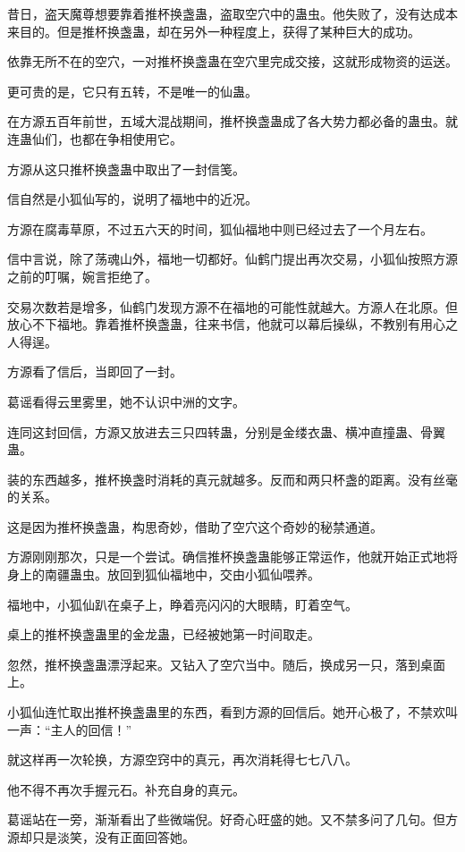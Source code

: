 \begin{this_body}
昔日，盗天魔尊想要靠着推杯换盏蛊，盗取空穴中的蛊虫。他失败了，没有达成本来目的。但是推杯换盏蛊，却在另外一种程度上，获得了某种巨大的成功。

依靠无所不在的空穴，一对推杯换盏蛊在空穴里完成交接，这就形成物资的运送。

更可贵的是，它只有五转，不是唯一的仙蛊。

在方源五百年前世，五域大混战期间，推杯换盏蛊成了各大势力都必备的蛊虫。就连蛊仙们，也都在争相使用它。

方源从这只推杯换盏蛊中取出了一封信笺。

信自然是小狐仙写的，说明了福地中的近况。

方源在腐毒草原，不过五六天的时间，狐仙福地中则已经过去了一个月左右。

信中言说，除了荡魂山外，福地一切都好。仙鹤门提出再次交易，小狐仙按照方源之前的叮嘱，婉言拒绝了。

交易次数若是增多，仙鹤门发现方源不在福地的可能性就越大。方源人在北原。但放心不下福地。靠着推杯换盏蛊，往来书信，他就可以幕后操纵，不教别有用心之人得逞。

方源看了信后，当即回了一封。

葛谣看得云里雾里，她不认识中洲的文字。

连同这封回信，方源又放进去三只四转蛊，分别是金缕衣蛊、横冲直撞蛊、骨翼蛊。

装的东西越多，推杯换盏时消耗的真元就越多。反而和两只杯盏的距离。没有丝毫的关系。

这是因为推杯换盏蛊，构思奇妙，借助了空穴这个奇妙的秘禁通道。

方源刚刚那次，只是一个尝试。确信推杯换盏蛊能够正常运作，他就开始正式地将身上的南疆蛊虫。放回到狐仙福地中，交由小狐仙喂养。

福地中，小狐仙趴在桌子上，睁着亮闪闪的大眼睛，盯着空气。

桌上的推杯换盏蛊里的金龙蛊，已经被她第一时间取走。

忽然，推杯换盏蛊漂浮起来。又钻入了空穴当中。随后，换成另一只，落到桌面上。

小狐仙连忙取出推杯换盏蛊里的东西，看到方源的回信后。她开心极了，不禁欢叫一声：“主人的回信！”

就这样再一次轮换，方源空窍中的真元，再次消耗得七七八八。

他不得不再次手握元石。补充自身的真元。

葛谣站在一旁，渐渐看出了些微端倪。好奇心旺盛的她。又不禁多问了几句。但方源却只是淡笑，没有正面回答她。


\end{this_body}
